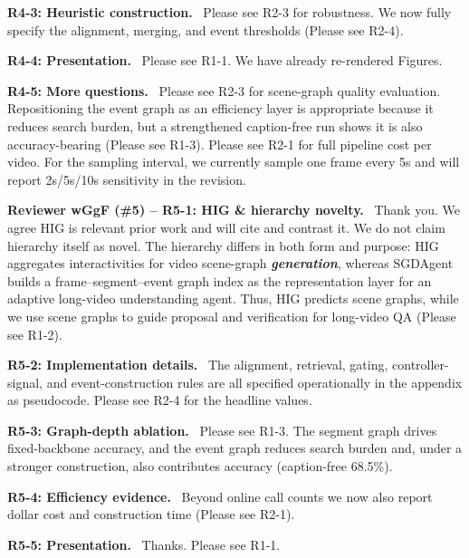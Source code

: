\documentclass[10pt,twocolumn]{article}
\newcommand{\rvcolor}{rvR1}
\newcommand{\pt}[1]{\textbf{\textcolor{\rvcolor}{#1}}\ }
\newcommand{\rv}[1]{\vspace{1.5pt}\pt{#1}}
\renewcommand{\emph}[1]{\textbf{\textit{#1}}}
\begin{document}
\pt{R4-3: Heuristic construction.} Please see R2-3 for robustness. We now fully specify
the alignment, merging, and event thresholds (Please see R2-4).

\pt{R4-4: Presentation.} Please see R1-1. We have already re-rendered Figures.

\pt{R4-5: More questions.} Please see R2-3 for scene-graph quality evaluation. Repositioning the event
graph as an efficiency layer is appropriate because it reduces search burden, but a strengthened
caption-free run shows it is also accuracy-bearing (Please see R1-3). Please see R2-1 for full pipeline cost
per video. For the sampling interval, we currently sample one frame every 5s and will report
2s/5s/10s sensitivity in the revision.

\renewcommand{\rvcolor}{rvR5}%
\rv{Reviewer wGgF (\#5) -- R5-1: HIG \& hierarchy novelty.} Thank you. We agree HIG
is relevant prior work and will cite and contrast it. We do not claim hierarchy
itself as novel. The hierarchy differs in both form and purpose: HIG aggregates
interactivities for video scene-graph \emph{generation}, whereas SGDAgent builds a
frame--segment--event graph index as the representation layer for an adaptive
long-video understanding agent. Thus, HIG predicts scene graphs, while we use scene
graphs to guide proposal and verification for long-video QA (Please see R1-2).

\pt{R5-2: Implementation details.} The alignment, retrieval, gating, controller-signal, and
event-construction rules are all specified operationally in the appendix as
pseudocode. Please see R2-4 for the headline values.

\pt{R5-3: Graph-depth ablation.} Please see R1-3. The segment graph drives
fixed-backbone accuracy, and the event graph reduces search burden and, under a
stronger construction, also contributes accuracy (caption-free 68.5\%).

\pt{R5-4: Efficiency evidence.} Beyond online call counts we now also report
dollar cost and construction time (Please see R2-1).

\pt{R5-5: Presentation.} Thanks. Please see R1-1.
\end{document}
